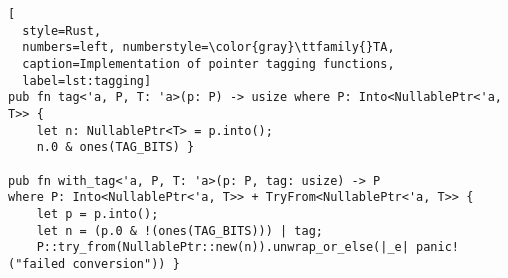 \begin{lstlisting}[
  style=Rust,
  numbers=left, numberstyle=\color{gray}\ttfamily{}TA,
  caption=Implementation of pointer tagging functions,
  label=lst:tagging]
pub fn tag<'a, P, T: 'a>(p: P) -> usize where P: Into<NullablePtr<'a, T>> {
    let n: NullablePtr<T> = p.into();
    n.0 & ones(TAG_BITS) }

pub fn with_tag<'a, P, T: 'a>(p: P, tag: usize) -> P
where P: Into<NullablePtr<'a, T>> + TryFrom<NullablePtr<'a, T>> {
    let p = p.into();
    let n = (p.0 & !(ones(TAG_BITS))) | tag;
    P::try_from(NullablePtr::new(n)).unwrap_or_else(|_e| panic!("failed conversion")) }


\end{lstlisting}
